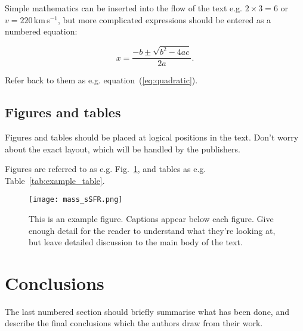 \documentclass[fleqn,usenatbib]{mnras}
\begin{document}
Simple mathematics can be inserted into the flow of the text e.g. $2\times3=6$
or $v=220$\,km\,s$^{-1}$, but more complicated expressions should be entered
as a numbered equation:

\begin{equation}
    x=\frac{-b\pm\sqrt{b^2-4ac}}{2a}.
	\label{eq:quadratic}
\end{equation}

Refer back to them as e.g. equation~(\ref{eq:quadratic}).

\subsection{Figures and tables}

Figures and tables should be placed at logical positions in the text. Don't
worry about the exact layout, which will be handled by the publishers.

Figures are referred to as e.g. Fig.~\ref{fig:example_figure}, and tables as
e.g. Table~\ref{tab:example_table}.

\begin{figure}
	\texttt{[image: mass\_sSFR.png]}
    \caption{This is an example figure. Captions appear below each figure.
	Give enough detail for the reader to understand what they're looking at,
	but leave detailed discussion to the main body of the text.}
    \label{fig:example_figure}
\end{figure}



\section{Conclusions}

The last numbered section should briefly summarise what has been done, and describe
the final conclusions which the authors draw from their work.















\label{lastpage}
\end{document}
